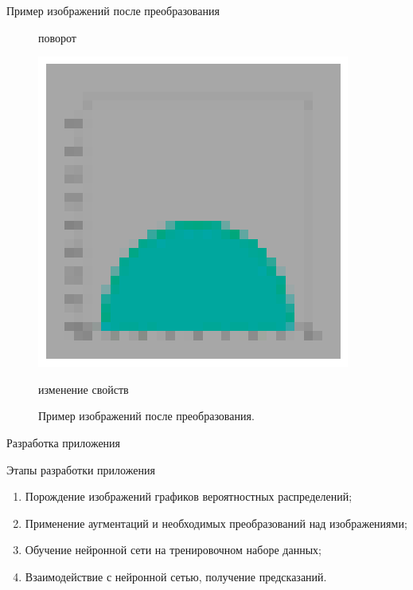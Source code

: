 \documentclass{beamer}
\begin{document}
\begin{frame}{Пример изображений после преобразования}
\begin{figure}[H]
\begin{minipage}[t]{.3\textwidth}
		\caption*{поворот}
	\end{minipage}
	\begin{minipage}[t]{.3\textwidth}
		\centering
		\includegraphics[width=\linewidth]{./img/color.png}
		\caption*{изменение свойств}
	\end{minipage}
	\caption{Пример изображений после преобразования.}
	\label{fig:transforms}
        \end{figure}


\end{frame}


\begin{frame}{Разработка приложения}

	\begin{alertblock}{Этапы разработки приложения}
            \begin{enumerate}
                \item Порождение изображений графиков вероятностных распределений;
                \item Применение аугментаций и необходимых преобразований над изображениями;
                \item Обучение нейронной сети на тренировочном наборе данных;
                \item Взаимодействие с нейронной сетью, получение предсказаний.
            \end{enumerate}
        \end{alertblock}

\end{frame}
\end{document}
